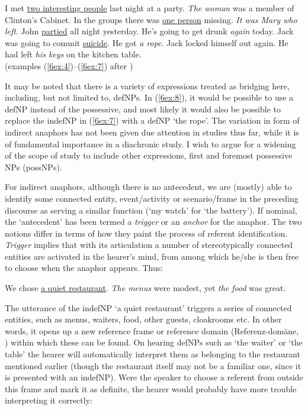 \documentclass[output=paper]{langsci/langscibook}
\begin{document}
\begin{exe}
\ex\label{6ex:4}
I met {\ul{two interesting people}} last night at a party. {\emph{The woman}} was a member of Clinton's Cabinet. 
\ex\label{6ex:5}
In the groups there was {\ul{one person}} missing. {\emph{It was Mary who left}}. 
\ex\label{6ex:6}
John {\ul{partied}} all night yesterday. He's going to get drunk {\emph{again}} today.
\ex\label{6ex:7}
Jack was going to commit {\ul{suicide}}. He got {\emph{a rope}}. 
\ex\label{6ex:8}
Jack locked himself out again. He had left {\emph{his keys}} on the kitchen table. \\
\hspace*{-0.8cm}(examples (\ref{6ex:4})--(\ref{6ex:7}) after \citealt[][83]{asher:lascarides:98})
\end{exe}

{
It may be noted that there is a variety of expressions treated as bridging here, including, but not limited to, defNPs. In (\ref{6ex:8}), it would be possible to use a defNP instead of the possessive, and most likely it would also be possible to replace the indefNP in (\ref{6ex:7}) with a defNP `the rope'. The variation in form of indirect anaphors has not been given due attention in studies thus far, while it is of fundamental importance in a diachronic study. I wish to argue for a widening of the scope of study to include other expressions, first and foremost possessive NPs (possNPs). 
}

{
For indirect anaphors, although there is no antecedent, we are (mostly) able to identify some connected entity, event/activity or scenario/frame in the preceding discourse as serving a similar function (`my watch' for `the battery'). If nominal, the `antecedent' has been termed a {\emph{trigger}} \citep{hawkins:78} or an {\emph{anchor}} \citep{fraurud:90} for the anaphor. The two notions differ in terms of how they paint the process of referent identification. {\emph{Trigger}} implies that with its articulation a number of stereotypically connected entities are activated in the hearer's mind, from among which he/she is then free to choose when the anaphor appears. Thus:
}

\begin{exe}
\ex\label{6ex:9}
{We chose {\ul{a quiet restaurant}}. {\emph{The menus}} were modest, yet {\emph{the food}} was great.}
\end{exe}

The utterance of the indefNP `a quiet restaurant' triggers a series of connected entities, such as menus, waiters, food, other guests, cloakrooms etc. In other words, it opens up a new reference frame or reference domain (Referenz-domäne, \citealt{schwarz:00}) within which these can be found. On hearing defNPs such as `the waiter' or `the table' the hearer will automatically interpret them as belonging to the restaurant mentioned earlier (though the restaurant itself may not be a familiar one, since it is presented with an indefNP). Were the speaker to choose a referent from outside this frame and mark it as definite, the hearer would probably have more trouble interpreting it correctly:
\end{document}

